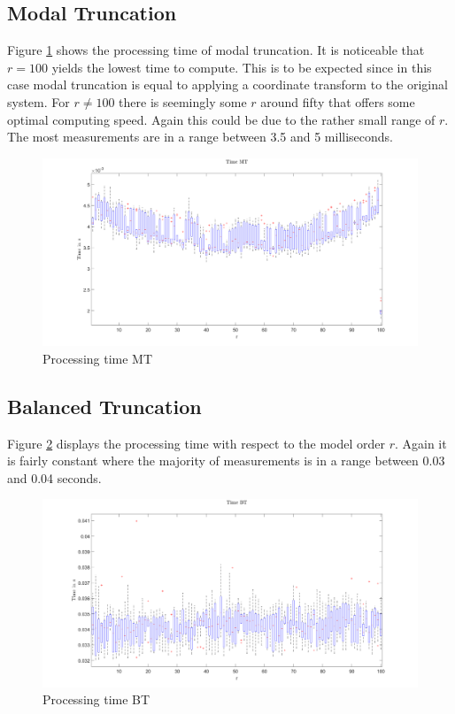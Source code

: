 \subsection{Modal Truncation}
Figure \ref{FIG-T-MT} shows the processing time of modal truncation.
It is noticeable that \(r = 100\) yields the lowest time to compute.
This is to be expected since in this case modal truncation is equal to applying a coordinate transform to the original system.
For \(r \neq 100\) there is seemingly some \(r\) around fifty that offers some optimal computing speed.
Again this could be due to the rather small range of  \(r\).
The most measurements are in a range between 3.5 and 5 milliseconds.
\begin{figure}[H]
\centering
\includegraphics[width=\textwidth]{images/time/MT}
\caption{Processing time MT}
\label{FIG-T-MT}
\end{figure}


\subsection{Balanced Truncation}
Figure \ref{FIG-T-BT} displays the processing time with respect to the model order \(r\).
Again it is fairly constant where the majority of measurements is in a range between 0.03 and 0.04 seconds.
\begin{figure}[H]
\centering
\includegraphics[width=\textwidth]{images/time/BT}
\caption{Processing time BT}
\label{FIG-T-BT}
\end{figure}


